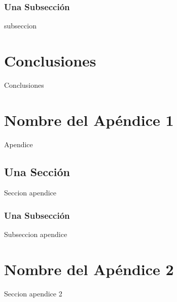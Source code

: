 \documentclass[12pt,a4paper,oneside]{book}
\begin{document}
\subsection{Una Subsección}

subseccion

\chapter{Conclusiones}
\label{conclusiones}

Conclusiones






\label{bibliografia}

\appendix %


\chapter{Nombre del Apéndice 1} 
\label{apendice1}
Apendice

\section{Una Sección}

Seccion apendice

\subsection{Una Subsección}

Subseccion apendice

\chapter{Nombre del Apéndice 2} 

Seccion apendice 2

\end{document}
